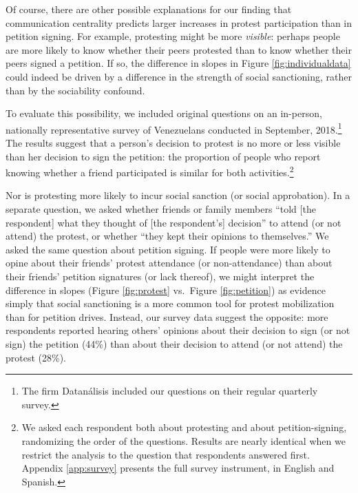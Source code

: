 \documentclass[12pt]{article}
\begin{document}
Of course, there are other possible explanations for our finding that communication centrality predicts larger increases in protest participation than in petition signing. For example, protesting might be more \emph{visible}: perhaps people are more likely to know whether their peers protested than to know whether their peers signed a petition. If so, the difference in slopes in Figure \ref{fig:individualdata} could indeed be driven by a difference in the strength of social sanctioning, rather than by the sociability confound.

To evaluate this possibility, we included original questions on an in-person, nationally representative survey of Venezuelans conducted in September, 2018.\footnote{The firm Datan\'{a}lisis included our questions on their regular quarterly survey.} The results suggest that a person's decision to protest is no more or less visible than her decision to sign the petition: the proportion of people who report knowing whether a friend participated is similar for both activities.\footnote{We asked each respondent both about protesting and about petition-signing, randomizing the order of the questions. Results are nearly identical when we restrict the analysis to the question that respondents answered first. Appendix \ref{app:survey} presents the full survey instrument, in English and Spanish.}

Nor is protesting more likely to incur social sanction (or social approbation). In a separate question, we asked whether friends or family members ``told [the respondent] what they thought of [the respondent's] decision'' to attend (or not attend) the protest, or whether ``they kept their opinions to themselves.'' We asked the same question about petition signing. If people were more likely to opine about their friends' protest attendance (or non-attendance) than about their friends' petition signatures (or lack thereof), we might interpret the difference in slopes (Figure \ref{fig:protest} vs.\ Figure \ref{fig:petition}) as evidence simply that social sanctioning is a more common tool for protest mobilization than for petition drives. Instead, our survey data suggest the opposite: more respondents reported hearing others' opinions about their decision to sign (or not sign) the petition (44\%) than about their decision to attend (or not attend) the protest (28\%).
\end{document}
